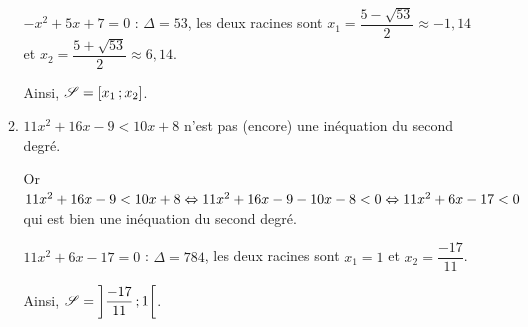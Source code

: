 \documentclass[a4paper,11pt]{article}
\begin{document}
\begin{enumerate}
\begin{enumerate}
		$-x^2+5x+7 = 0$ : $\Delta=53$, les deux racines sont $x_1=\dfrac{5-\sqrt{53}}{2} \approx -1,14$ et $x_2=\dfrac{5+\sqrt{53}}{2} \approx 6,14$.
		
		\begin{center}
		\end{center}
		Ainsi, $\mathscr{S}=\mbox{\ensuremath{\left[x_1\mathpunct{};x_2\right]}}$.
		\item $11x^2+16x-9<10x+8$ n'est pas (encore) une inéquation du second degré.
		
		Or $11x^2+16x-9<10x+8 \Leftrightarrow 11x^2+16x-9-10x-8<0 \Leftrightarrow 11x^2+6x-17<0$ qui est bien une inéquation du second degré.
		
		$11x^2+6x-17 = 0$ : $\Delta=784$, les deux racines sont $x_1=1$ et $x_2=\dfrac{-17}{11}$.
		
		\begin{center}
		\end{center}
		Ainsi, $\mathscr{S}=\mbox{\ensuremath{\left]\dfrac{-17}{11}\mathpunct{};1\right[}}$.
	\end{enumerate}
\end{enumerate}

\pagebreak

\end{document}
